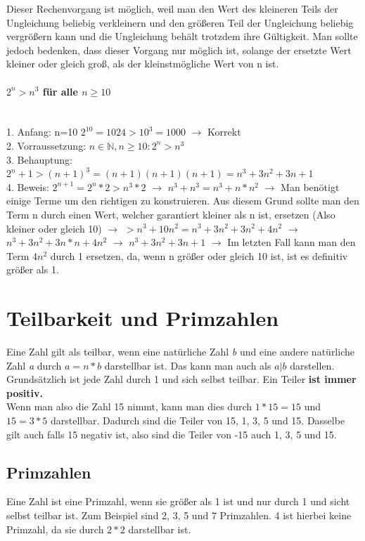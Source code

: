 \documentclass{article}
\newcommand{\paragraphlb}[1]{\paragraph{#1}\mbox{}\\}
\newcommand{\N}{\mathbb{N}}
\begin{document}
	Dieser Rechenvorgang ist möglich, weil man den Wert des kleineren Teils der Ungleichung beliebig verkleinern und den größeren Teil der Ungleichung beliebig vergrößern kann und die Ungleichung behält trotzdem ihre Gültigkeit. Man sollte jedoch bedenken, dass dieser Vorgang nur möglich ist, solange der ersetzte Wert kleiner oder gleich groß, als der kleinstmögliche Wert von n ist.
	\paragraphlb{$2^n > n^3$ für alle $n \geq 10$}
	1. Anfang: n=10 $2^10 = 1024 > 10^3 = 1000$ $\to$ Korrekt \\
	2. Vorraussetzung: $n\in\N, n\geq10:2^n>n^3$ \\
	3. Behauptung: $2^n+1>(n+1)^3 = (n+1)(n+1)(n+1)=n^3+3n^2+3n+1$ \\
	4. Beweis: $2^{n+1}=2^n*2 > n^3*2$ $\to$ $n^3 + n^3 = n^3 + n*n^2$ $\to$ Man benötigt einige Terme um den richtigen zu konstruieren. Aus diesem Grund sollte man den Term n durch einen Wert, welcher garantiert kleiner als n ist, ersetzen (Also kleiner oder gleich 10) $\to$ $> n^3 +10n^2 = n^3+3n^2+3n^2+4n^2$ $\to$ $n^3+3n^2+3n*n+4n^2$ $\to$ $n^3+3n^2+3n+1$ $\to$ Im letzten Fall kann man den Term $4n^2$ durch 1 ersetzen, da, wenn n größer oder gleich 10 ist, ist es definitiv größer als 1.
	\section{Teilbarkeit und Primzahlen}
	Eine Zahl gilt als teilbar, wenn eine natürliche Zahl \textit{b} und eine andere natürliche Zahl \textit{a} durch $a=n*b$ darstellbar ist. Das kann man auch als $a|b$ darstellen. \\
	Grundsätzlich ist jede Zahl durch 1 und sich selbst teilbar. Ein Teiler \textbf{ist immer positiv.} \\
	Wenn man also die Zahl 15 nimmt, kann man dies durch $1*15 = 15$ und $15 = 3*5$ darstellbar. Dadurch sind die Teiler von 15, 1, 3, 5 und 15. Dasselbe gilt auch falls 15 negativ ist, also sind die Teiler von -15 auch 1, 3, 5 und 15.
	\subsection{Primzahlen}
	Eine Zahl ist eine Primzahl, wenn sie größer als 1 ist und nur durch 1 und sicht selbst teilbar ist. Zum Beispiel sind 2, 3, 5 und 7 Primzahlen. 4 ist hierbei keine Primzahl, da sie durch $2*2$ darstellbar ist.
\end{document}
